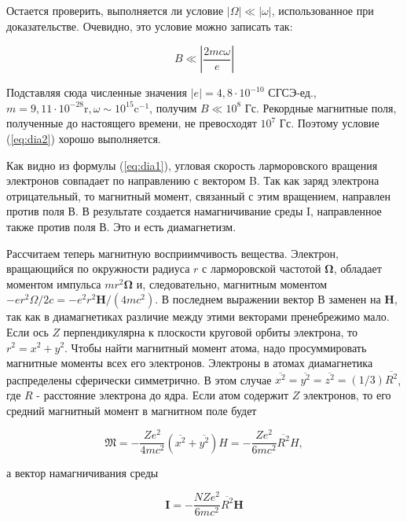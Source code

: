 \documentclass[12pt]{article}
\begin{document}
  Остается проверить, выполняется ли условие $|\Omega| \ll|\omega|$, использованное при доказательстве. Очевидно, это условие можно записать так:

  \begin{equation}
  \label{eq:dia2}
  B \ll\left|\frac{2 m c \omega}{e}\right|
  \end{equation}


  Подставляя сюда численные значения $|e|=4,8 \cdot 10^{-10}$ СГСЭ-ед., $m=9,11 \cdot 10^{-28} \mathrm{r}, \omega \sim 10^{15} \mathrm{c}^{-1}$, получим $B \ll 10^8$ Гс. Рекордные магнитные поля, полученные до настоящего времени, не превосходят $10^7$ Гс. Поэтому условие (\ref{eq:dia2}) хорошо выполняется.

  Как видно из формулы (\ref{eq:dia1}), угловая скорость ларморовского вращения электронов совпадает по направлению с вектором B. Так как заряд электрона отрицательный, то магнитный момент, связанный с этим вращением, направлен против поля В. В результате создается намагничивание среды I, направленное также против поля В. Это и есть диамагнетизм.

  Рассчитаем теперь магнитную восприимчивость вещества. Электрон, вращающийся по окружности радиуса $r$ с ларморовской частотой $\boldsymbol{\Omega}$, обладает моментом импульса $m r^2 \boldsymbol{\Omega}$ и, следовательно, магнитным моментом $-e r^2 \Omega / 2 c=-e^2 r^2 \mathbf{H} /\left(4 m c^2\right)$. В последнем выражении вектор В заменен на $\mathbf{H}$, так как в диамагнетиках различие между этими векторами пренебрежимо мало. Если ось $Z$ перпендикулярна
  к плоскости круговой орбиты электрона, то $r^2=x^2+y^2$. Чтобы найти магнитный момент атома, надо просуммировать магнитные моменты всех его электронов. Электроны в атомах диамагнетика распределены сферически симметрично. В этом случае $\overline{x^2}=\overline{y^2}=\overline{z^2}=(1 / 3) \overline{R^2}$, где $R$ - расстояние электрона до ядра. Если атом содержит $Z$ электронов, то его средний магнитный момент в магнитном поле будет

  \begin{equation}
  \mathfrak{M}=-\frac{Z e^2}{4 m c^2}\left(\overline{x^2}+\overline{y^2}\right) H=-\frac{Z e^2}{6 m c^2} \overline{R^2} H,
  \end{equation}


  а вектор намагничивания среды

  \begin{equation}
  \label{eq:dia4}
  \mathbf{I}=-\frac{N Z e^2}{6 m c^2} \overline{R^2} \mathbf{H}
  \end{equation}
\end{document}
